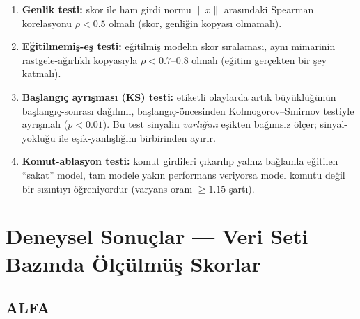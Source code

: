 \documentclass[11pt,a4paper]{article}
\begin{document}
\begin{enumerate}[itemsep=2pt]
  \item \textbf{Genlik testi:} skor ile ham girdi normu $\lVert x\rVert$
        arasındaki Spearman korelasyonu $\rho < 0.5$ olmalı (skor, genliğin
        kopyası olmamalı).
  \item \textbf{Eğitilmemiş-eş testi:} eğitilmiş modelin skor sıralaması, aynı
        mimarinin rastgele-ağırlıklı kopyasıyla $\rho < 0.7$--$0.8$ olmalı
        (eğitim gerçekten bir şey katmalı).
  \item \textbf{Başlangıç ayrışması (KS) testi:} etiketli olaylarda artık
        büyüklüğünün başlangıç-sonrası dağılımı, başlangıç-öncesinden
        Kolmogorov--Smirnov testiyle ayrışmalı ($p<0.01$). Bu test sinyalin
        \emph{varlığını} eşikten bağımsız ölçer; sinyal-yokluğu ile
        eşik-yanlışlığını birbirinden ayırır.
  \item \textbf{Komut-ablasyon testi:} komut girdileri çıkarılıp yalnız
        bağlamla eğitilen ``sakat'' model, tam modele yakın performans
        veriyorsa model komutu değil bir sızıntıyı öğreniyordur
        (varyans oranı $\geq 1.15$ şartı).
\end{enumerate}

\section{Deneysel Sonuçlar --- Veri Seti Bazında Ölçülmüş Skorlar}
\label{sec:sonuc}

\subsection{ALFA}
\label{sec:alfa-sonuc}
\end{document}
